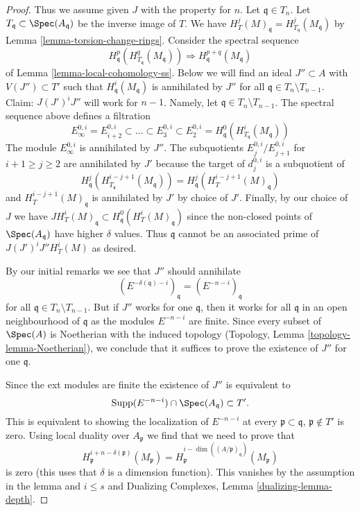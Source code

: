 \begin{proof}
\medskip\noindent
Thus we assume given $J$ with the property for $n$.
Let $\mathfrak q \in T_n$. Let $T_\mathfrak q \subset \Spec(A_\mathfrak q)$
be the inverse image of $T$. We have
$H^j_T(M)_\mathfrak q = H^j_{T_\mathfrak q}(M_\mathfrak q)$
by Lemma \ref{lemma-torsion-change-rings}.
Consider the spectral sequence
$$
H_\mathfrak q^p(H^q_{T_\mathfrak q}(M_\mathfrak q))
\Rightarrow
H^{p + q}_\mathfrak q(M_\mathfrak q)
$$
of Lemma \ref{lemma-local-cohomology-ss}.
Below we will find an ideal $J'' \subset A$ with $V(J'') \subset T'$
such that $H^i_\mathfrak q(M_\mathfrak q)$ is annihilated by $J''$ for all
$\mathfrak q \in T_n \setminus T_{n - 1}$.
Claim: $J (J')^i J''$ will work for $n - 1$.
Namely, let $\mathfrak q \in T_n \setminus T_{n - 1}$.
The spectral sequence above defines a filtration
$$
E_\infty^{0, i} = E_{i + 2}^{0, i} \subset \ldots \subset E_3^{0, i} \subset
E_2^{0, i} = H^0_\mathfrak q(H^i_{T_\mathfrak q}(M_\mathfrak q))
$$
The module $E_\infty^{0, i}$ is annihilated by $J''$.
The subquotients $E_j^{0, i}/E_{j + 1}^{0, i}$ for $i + 1 \geq j \geq 2$
are annihilated by $J'$ because the target of $d_j^{0, i}$
is a subquotient of
$$
H^j_\mathfrak q(H^{i - j + 1}_{T_\mathfrak q}(M_\mathfrak q)) =
H^j_\mathfrak q(H^{i - j + 1}_T(M)_\mathfrak q)
$$
and $H^{i - j + 1}_T(M)_\mathfrak q$ is annihilated by $J'$ by choice of $J'$.
Finally, by our choice of $J$ we have
$J H^i_T(M)_\mathfrak q \subset H^0_\mathfrak q(H^i_T(M)_\mathfrak q)$
since the non-closed points of $\Spec(A_\mathfrak q)$ have higher
$\delta$ values. Thus $\mathfrak q$ cannot be an associated prime of
$J(J')^iJ'' H^i_T(M)$ as desired.

\medskip\noindent
By our initial remarks we see that $J''$ should annihilate
$$
(E^{-\delta(\mathfrak q) - i})_\mathfrak q =
(E^{-n - i})_\mathfrak q
$$
for all $\mathfrak q \in T_n \setminus T_{n - 1}$.
But if $J''$ works for one $\mathfrak q$, then it works for all
$\mathfrak q$ in an open neighbourhood of $\mathfrak q$
as the modules $E^{-n - i}$ are finite.
Since every subset of $\Spec(A)$ is Noetherian with the induced
topology (Topology, Lemma \ref{topology-lemma-Noetherian}),
we conclude that it suffices
to prove the existence of $J''$ for one $\mathfrak q$.

\medskip\noindent
Since the ext modules are finite the existence of $J''$ is
equivalent to
$$
\text{Supp}(E^{-n - i}) \cap \Spec(A_\mathfrak q) \subset T'.
$$
This is equivalent to showing the localization of $E^{-n - i}$ at every
$\mathfrak p \subset \mathfrak q$, $\mathfrak p \not \in T'$
is zero. Using local duality over $A_\mathfrak p$ we find that we need
to prove that
$$
H^{i + n - \delta(\mathfrak p)}_\mathfrak p(M_\mathfrak p) =
H^{i - \dim((A/\mathfrak p)_\mathfrak q)}_\mathfrak p(M_\mathfrak p)
$$
is zero (this uses that $\delta$ is a dimension function).
This vanishes by the assumption in the lemma and $i \leq s$ and
Dualizing Complexes, Lemma \ref{dualizing-lemma-depth}.


\end{proof}
